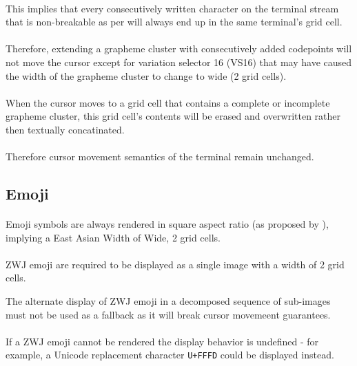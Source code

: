 \documentclass{article}
\newcommand{\code}[1]{\colorbox{light-gray}{\texttt{#1}}}
\begin{document}
\paragraph*{}
This implies that every consecutively written character on the terminal
stream that is non-breakable as per \cite{UTS-29} will
always end up in the same terminal's grid cell.

\paragraph*{}
Therefore, extending a grapheme cluster with consecutively added codepoints
will not move the cursor except for variation selector 16 (VS16) that may
have caused the width of the grapheme cluster to change to wide (2 grid cells).

\paragraph*{}
When the cursor moves to a grid cell that contains a complete or incomplete
grapheme cluster, this grid cell's contents will be erased and overwritten
rather then textually concatinated.

\paragraph*{}
Therefore cursor movement semantics of the terminal remain unchanged.

\subsection{Emoji}

\paragraph*{}
Emoji symbols are always rendered in square aspect ratio
(as proposed by \cite{UTS-51}),
implying a East Asian Width of Wide, 2 grid cells.

\paragraph*{}
ZWJ emoji are required to be displayed as a single image with a width of 2 grid cells.

The alternate display of ZWJ emoji in a decomposed sequence of sub-images
must not be used as a fallback as it will break cursor movemeent guarantees.

\paragraph*{}
If a ZWJ emoji cannot be rendered the display behavior is undefined -
for example, a Unicode replacement character \code{U+FFFD} could be
displayed instead.
\end{document}
